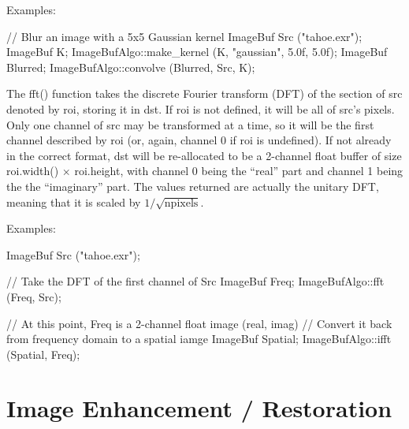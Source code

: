 \smallskip
\noindent Examples:
\begin{code}
    // Blur an image with a 5x5 Gaussian kernel
    ImageBuf Src ("tahoe.exr");
    ImageBuf K;
    ImageBufAlgo::make_kernel (K, "gaussian", 5.0f, 5.0f);
    ImageBuf Blurred;
    ImageBufAlgo::convolve (Blurred, Src, K);
\end{code}
\apiend

 
 

The {\cf fft()} function takes the discrete Fourier transform (DFT) of
the section of {\cf src} denoted by {\cf roi}, storing it in {\cf dst}.
If {\cf roi} is not defined, it will be all of {\cf src}'s pixels.  Only
one channel of {\cf src} may be transformed at a time, so it will be the
first channel described by {\cf roi} (or, again, channel 0 if {\cf roi}
is undefined).  If not already in the correct format, {\cf dst} will be
re-allocated to be a 2-channel {\cf float} buffer of size 
{\cf roi.width()} $\times$ {\cf roi.height}, with channel 0 being the
``real'' part and channel 1 being the the ``imaginary'' part.  The
values returned are actually the unitary DFT, meaning that it is scaled
by $1/\sqrt{\mathrm{npixels}}$.

\smallskip
\noindent Examples:
\begin{code}
    ImageBuf Src ("tahoe.exr");

    // Take the DFT of the first channel of Src
    ImageBuf Freq;
    ImageBufAlgo::fft (Freq, Src);

    // At this point, Freq is a 2-channel float image (real, imag)
    // Convert it back from frequency domain to a spatial iamge
    ImageBuf Spatial;
    ImageBufAlgo::ifft (Spatial, Freq);
\end{code}
\apiend



\section{Image Enhancement / Restoration}
\label{sec:iba:enhance}

 

